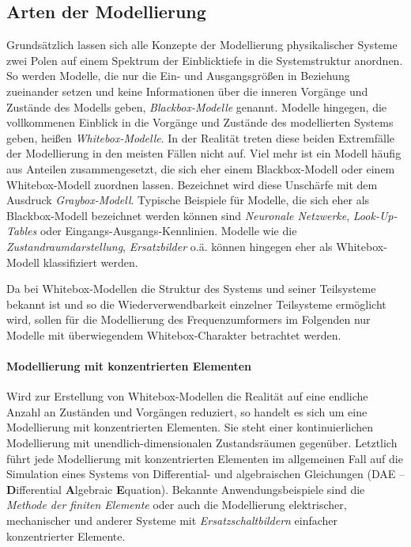 \subsection{Arten der Modellierung}
\label{subsec:ArtenModellierung}
Grundsätzlich lassen sich alle Konzepte der Modellierung physikalischer Systeme zwei Polen auf einem Spektrum der Einblicktiefe in die Systemstruktur anordnen. So werden Modelle, die nur die Ein- und Ausgangsgrößen in Beziehung zueinander setzen und keine Informationen über die inneren Vorgänge und Zustände des Modells geben, \emph{Blackbox-Modelle} genannt. Modelle hingegen, die vollkommenen Einblick in die Vorgänge und Zustände des modellierten Systems geben, heißen \emph{Whitebox-Modelle}. In der Realität treten diese beiden Extremfälle der Modellierung in den meisten Fällen nicht auf. Viel mehr ist ein Modell häufig aus Anteilen zusammengesetzt, die sich eher einem Blackbox-Modell oder einem Whitebox-Modell zuordnen lassen. Bezeichnet wird diese Unschärfe mit dem Ausdruck \emph{Graybox-Modell}. Typische Beispiele für Modelle, die sich eher als Blackbox-Modell bezeichnet werden können sind \emph{Neuronale Netzwerke}, \emph{Look-Up-Tables} oder Eingangs-Ausgangs-Kennlinien. Modelle wie die \emph{Zustandraumdarstellung}, \emph{Ersatzbilder} o.ä. können hingegen eher als Whitebox-Modell klassifiziert werden. 

Da bei Whitebox-Modellen die Struktur des Systems und seiner Teilsysteme bekannt ist und so die Wiederverwendbarkeit einzelner Teilsysteme ermöglicht wird, sollen für die Modellierung des Frequenzumformers im Folgenden nur Modelle mit überwiegendem Whitebox-Charakter betrachtet werden.

\paragraph{Modellierung mit konzentrierten Elementen} Wird zur Erstellung von Whitebox-Modellen die Realität auf eine endliche Anzahl an Zuständen und Vorgängen reduziert, so handelt es sich um eine Modellierung mit konzentrierten Elementen. Sie steht einer kontinuierlichen Modellierung mit unendlich-dimensionalen Zustandsräumen gegenüber. Letztlich führt jede Modellierung mit konzentrierten Elementen im allgemeinen Fall auf die Simulation eines Systems von Differential- und algebraischen Gleichungen (DAE -- \textbf{D}ifferential \textbf{A}lgebraic \textbf{E}quation). Bekannte Anwendungsbeispiele sind die \emph{Methode der finiten Elemente} oder auch die Modellierung elektrischer, mechanischer und anderer Systeme mit \emph{Ersatzschaltbildern} einfacher konzentrierter Elemente. 

